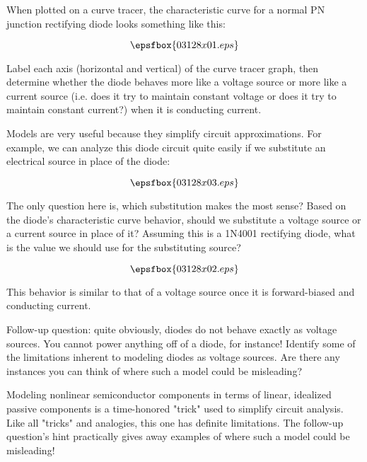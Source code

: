 

When plotted on a curve tracer, the characteristic curve for a normal PN junction rectifying diode looks something like this:

$$\epsfbox{03128x01.eps}$$

Label each axis (horizontal and vertical) of the curve tracer graph, then determine whether the diode behaves more like a voltage source or more like a current source (i.e. does it try to maintain constant voltage or does it try to maintain constant current?) when it is conducting current.  

Models are very useful because they simplify circuit approximations.  For example, we can analyze this diode circuit quite easily if we substitute an electrical source in place of the diode:

$$\epsfbox{03128x03.eps}$$

The only question here is, which substitution makes the most sense?  Based on the diode's characteristic curve behavior, should we substitute a voltage source or a current source in place of it?  Assuming this is a 1N4001 rectifying diode, what is the value we should use for the substituting source?







$$\epsfbox{03128x02.eps}$$

This behavior is similar to that of a voltage source once it is forward-biased and conducting current.

\vskip 10pt

Follow-up question: quite obviously, diodes do not behave exactly as voltage sources.  You cannot power anything off of a diode, for instance!  Identify some of the limitations inherent to modeling diodes as voltage sources.  Are there any instances you can think of where such a model could be misleading?







Modeling nonlinear semiconductor components in terms of linear, idealized passive components is a time-honored "trick" used to simplify circuit analysis.  Like all "tricks" and analogies, this one has definite limitations.  The follow-up question's hint practically gives away examples of where such a model could be misleading!




